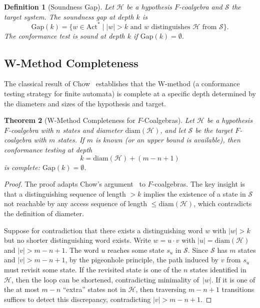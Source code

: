 \documentclass[11pt]{article}
\newtheorem{theorem}{Theorem}
\newtheorem{definition}[theorem]{Definition}
\newcommand{\Act}{\ensuremath{\mathrm{Act}}}
\newcommand{\diam}{\ensuremath{\mathrm{diam}}}
\begin{document}
\begin{definition}[Soundness Gap]
\label{def:gap}
Let $\mathcal{H}$ be a hypothesis $F$-coalgebra and $\mathcal{S}$ the
target system.
The \emph{soundness gap at depth $k$} is
\[
  \mathrm{Gap}(k) = \{w \in \Act^* \mid |w| > k
    \text{ and } w \text{ distinguishes } \mathcal{H} \text{ from } \mathcal{S}\}.
\]
The conformance test is \emph{sound} at depth $k$ if $\mathrm{Gap}(k) = \emptyset$.
\end{definition}

\subsection{W-Method Completeness}

The classical result of Chow~\cite{Chow78} establishes that the W-method
(a conformance testing strategy for finite automata) is complete at a
specific depth determined by the diameters and sizes of the hypothesis
and target.

\begin{theorem}[W-Method Completeness for $F$-Coalgebras]
\label{thm:wmethod}
Let $\mathcal{H}$ be a hypothesis $F$-coalgebra with $n$ states and
diameter $\diam(\mathcal{H})$, and let $\mathcal{S}$ be the target
$F$-coalgebra with $m$ states.
If $m$ is known (or an upper bound is available), then conformance testing
at depth
\begin{equation}\label{eq:wdepth}
  k = \diam(\mathcal{H}) + (m - n + 1)
\end{equation}
is complete: $\mathrm{Gap}(k) = \emptyset$.
\end{theorem}

\begin{proof}
The proof adapts Chow's argument~\cite{Chow78} to $F$-coalgebras.
The key insight is that a distinguishing sequence of length $> k$
implies the existence of a state in $\mathcal{S}$ not reachable
by any access sequence of length $\leq \diam(\mathcal{H})$, which
contradicts the definition of diameter.

Suppose for contradiction that there exists a distinguishing word
$w$ with $|w| > k$ but no shorter distinguishing word exists.
Write $w = u \cdot v$ with $|u| = \diam(\mathcal{H})$ and $|v| > m - n + 1$.
The word $u$ reaches some state $s_u$ in $\mathcal{S}$.
Since $\mathcal{S}$ has $m$ states and $|v| > m - n + 1$, by the
pigeonhole principle, the path induced by $v$ from $s_u$ must revisit
some state.
If the revisited state is one of the $n$ states identified in $\mathcal{H}$,
then the loop can be shortened, contradicting minimality of~$|w|$.
If it is one of the at most $m - n$ ``extra'' states not in $\mathcal{H}$,
then traversing $m - n + 1$ transitions suffices to detect this discrepancy,
contradicting $|v| > m - n + 1$.
\end{proof}
\end{document}
